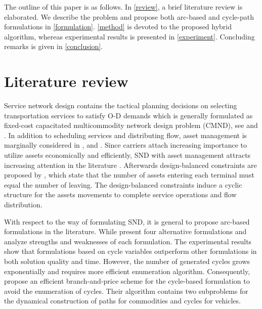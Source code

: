 \documentclass[11pt,nonblindrev,fleqn]{article}
\begin{document}
The outline of this paper is as follows. In \autoref{review}, a brief literature review is elaborated. We describe the problem and propose both arc-based and cycle-path formulations in \autoref{formulation}. \autoref{method} is devoted to the proposed hybrid algorithm, whereas experimental results is presented in \autoref{experiment}. Concluding remarks is given in \autoref{conclusion}.

\section{Literature review}\label{review}
Service network design contains the tactical planning decisions on selecting transportation services to satisfy O-D demands which is generally formulated as fixed-cost capacitated multicommodity network design problem (CMND), see \cite{Magnanti1984Network} and \cite{Minoux1989Networks}. In addition to scheduling services and distributing flow, asset management is marginally considered in \cite{Crainic2000Service}, \cite{Smilowitz2002Deferred} and \cite{crainic2003long}. Since carriers attach increasing importance to utilize assets economically and efficiently, SND with asset management attracts increasing attention in the literature \citep{Andersen2009bService,Teypaz2010A}.   Afterwards design-balanced constraints are proposed by \cite{Pedersen2009Models}, which state that the number of assets entering each terminal must equal the number of leaving. The design-balanced constraints induce a cyclic structure for the assets movements to complete service operations and flow distribution.

With respect to the way of formulating SND, it is general to propose arc-based formulations in the literature. While \cite{Andersen2009bService} present four alternative formulations and analyze strengths and weaknesses of each formulation. The experimental results show that formulations based on cycle variables outperform other formulations in both solution quality and time. However, the number of generated cycles grows exponentially and requires more efficient enumeration algorithm. Consequently, \cite{Andersen2011Branch} propose an efficient branch-and-price scheme for the cycle-based formulation to avoid the enumeration of cycles. Their algorithm contains two subproblems for the dynamical construction of paths for commodities and cycles for vehicles.
\end{document}
